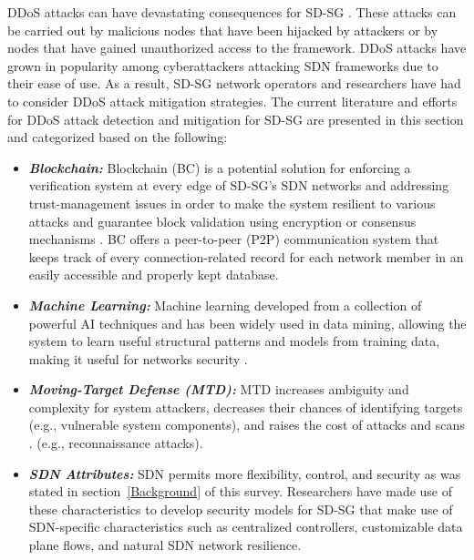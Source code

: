 \documentclass[conference]{IEEEtran}
\begin{document}
DDoS attacks can have devastating consequences for SD-SG \cite{agnew2022implementation, starke2022cross}. These attacks can be carried out by malicious nodes that have been hijacked by attackers or by nodes that have gained unauthorized access to the framework. DDoS attacks have grown in popularity among cyberattackers attacking SDN frameworks \cite{dantas2020taxonomy} due to their ease of use. As a result, SD-SG network operators and researchers have had to consider DDoS attack mitigation strategies. The current literature and efforts for DDoS attack detection and mitigation for SD-SG are presented in this section and categorized based on the following:
\begin{itemize}
    \item \textbf{\emph{Blockchain:}} Blockchain (BC) is a potential solution for enforcing a verification system at every edge of SD-SG's SDN networks and addressing trust-management issues in order to make the system resilient to various attacks and guarantee block validation using encryption or consensus mechanisms \cite{rahman2022integration,mollah2020blockchain }. BC offers a peer-to-peer (P2P) communication system that keeps track of every connection-related record for each network member in an easily accessible and properly kept database.
    \item \textbf{\emph{Machine Learning:}} Machine learning developed from a collection of powerful AI techniques and has been widely used in data mining, allowing the system to learn useful structural patterns and models from training data, making it useful for networks security \cite{xie2018survey}.
    \item \textbf{\emph{Moving-Target Defense (MTD):}} MTD increases ambiguity and complexity for system attackers, decreases their chances of identifying targets (e.g., vulnerable system components), and raises the cost of attacks and scans \cite{cho2020toward}. (e.g., reconnaissance attacks). 
    \item \textbf{\emph{SDN Attributes:}} SDN permits more flexibility, control, and security as was stated in section~\ref{Background} of this survey. Researchers have made use of these characteristics to develop security models for SD-SG that make use of SDN-specific characteristics such as centralized controllers, customizable data plane flows, and natural SDN network resilience. 
\end{itemize}
\end{document}
